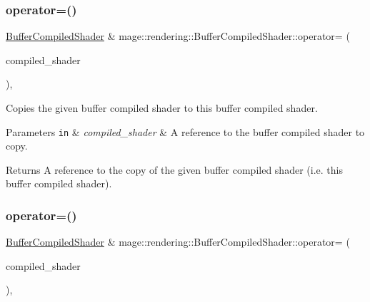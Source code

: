 \subsubsection{\texorpdfstring{operator=()}{operator=()}\hspace{0.1cm}{\footnotesize\ttfamily [1/2]}}
{\footnotesize\ttfamily \hyperlink{classmage_1_1rendering_1_1_buffer_compiled_shader}{Buffer\+Compiled\+Shader} \& mage\+::rendering\+::\+Buffer\+Compiled\+Shader\+::operator= (\begin{DoxyParamCaption}\item[{const \hyperlink{classmage_1_1rendering_1_1_buffer_compiled_shader}{Buffer\+Compiled\+Shader} \&}]{compiled\+\_\+shader }\end{DoxyParamCaption})\hspace{0.3cm}{\ttfamily [default]}, {\ttfamily [noexcept]}}

Copies the given buffer compiled shader to this buffer compiled shader.


\begin{DoxyParams}[1]{Parameters}
\mbox{\tt in}  & {\em compiled\+\_\+shader} & A reference to the buffer compiled shader to copy. \\
\hline
\end{DoxyParams}
\begin{DoxyReturn}{Returns}
A reference to the copy of the given buffer compiled shader (i.\+e. this buffer compiled shader). 
\end{DoxyReturn}
\hypertarget{classmage_1_1rendering_1_1_buffer_compiled_shader_a0e11565292a427dff5b36ef7c26b6d08}{}\label{classmage_1_1rendering_1_1_buffer_compiled_shader_a0e11565292a427dff5b36ef7c26b6d08} 
\subsubsection{\texorpdfstring{operator=()}{operator=()}\hspace{0.1cm}{\footnotesize\ttfamily [2/2]}}
{\footnotesize\ttfamily \hyperlink{classmage_1_1rendering_1_1_buffer_compiled_shader}{Buffer\+Compiled\+Shader} \& mage\+::rendering\+::\+Buffer\+Compiled\+Shader\+::operator= (\begin{DoxyParamCaption}\item[{\hyperlink{classmage_1_1rendering_1_1_buffer_compiled_shader}{Buffer\+Compiled\+Shader} \&\&}]{compiled\+\_\+shader }\end{DoxyParamCaption})\hspace{0.3cm}{\ttfamily [default]}, {\ttfamily [noexcept]}}

